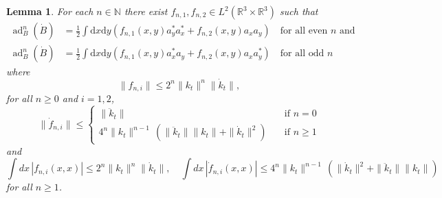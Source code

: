 \documentclass[11pt,a4paper]{article}
\newtheorem{lem}[thm]{Lemma}
\newcommand{\ad}{\operatorname{ad}}	%
\newcommand{\di}{\textrm{d}}		%
\newcommand{\Rbb}{\mathbb{R}}		%
\newcommand{\Nbb}{\mathbb{N}}		%
\newcommand{\norm}[1]{\lVert#1\rVert}	%
\begin{document}
\begin{lem}
\label{lm:highercommutators}
 For each $n \in \Nbb$ there exist $f_{n,1}, f_{n,2} \in L^2(\Rbb^3 \times \Rbb^3)$ such that
\begin{equation}\label{eq:adnBB} \begin{split}
\ad^n_B(\dot B) &= \frac{1}{2} \int \di x\di y\left( f_{n,1}(x,y) a^\ast_y a^\ast_x + f_{n,2}(x,y) a_x a_y \right) \quad \text{for all even $n$ and }\\
\ad^n_B(\dot B) &= \frac{1}{2} \int \di x\di y\left( f_{n,1}(x,y) a^\ast_x a_y + f_{n,2}(x,y) a_x a^\ast_y \right) \quad \text{for all odd $n$}
\end{split} \end{equation}
where \begin{equation}\label{eq:est-fn}  \| f_{n,i} \|  \leq 2^n \norm{k_t}^n \| \dot{k}_t \| , 
\end{equation}
for all $n \geq 0$ and $i=1,2$, 
\begin{equation}\label{eq:est-dotfn}
\| \dot{f}_{n,i} \| \leq \left\{ \begin{array}{ll} \| \ddot k_t \| \quad & \text{if } n = 0 \\ 
4^n \| k_t \|^{n-1} \, \left( \| \ddot{k}_t \|  \| k_t \| + \|\dot{k}_t \|^{2} \right) \quad & \text{if } n \geq 1 \end{array} \right. 
\end{equation}
and
\begin{equation}\label{eq:est-fn2} \int dx  \, |f_{n,i} (x,x)|  \leq  2^n \norm{k_t}^n \| \dot{k}_t \| , \quad \int dx \, | \dot{f}_{n,i} (x,x)| \leq  4^n \| k_t \|^{n-1} \, \left( \| \dot{k}_t \|^2 + \| \ddot{k}_t \| \| k_t \|\right)
\end{equation}
for all $n \geq 1$.  
\end{lem}
\end{document}
